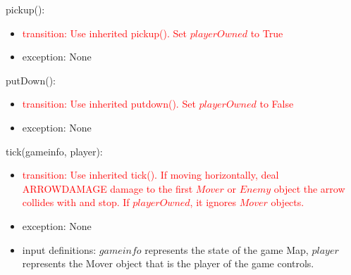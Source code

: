 \documentclass[12pt]{article}
\newcommand{\Implies}{\Rightarrow}
\newcommand{\m}[1]{\mbox{#1}}
\begin{document}
\noindent pickup():
\begin{itemize}
    \item \textcolor{red}{transition: Use inherited pickup(). Set $playerOwned$ to True}
    \item exception: None
\end{itemize}

\noindent putDown():
\begin{itemize}
    \item \textcolor{red}{transition: Use inherited putdown(). Set $playerOwned$ to False}
    \item exception: None
\end{itemize}

\noindent tick(gameinfo, player):
\begin{itemize}
    \item \textcolor{red}{transition: Use inherited tick(). If moving horizontally, deal ARROWDAMAGE damage to the first $Mover$ or $Enemy$ object the arrow collides with and stop. If $playerOwned$, it ignores $Mover$ objects.}
    \item exception: None
    \item input definitions: $gameinfo$ represents the state of the game Map, $player$ represents the Mover object that is the player of the game controls.
\end{itemize}
\end{document}
